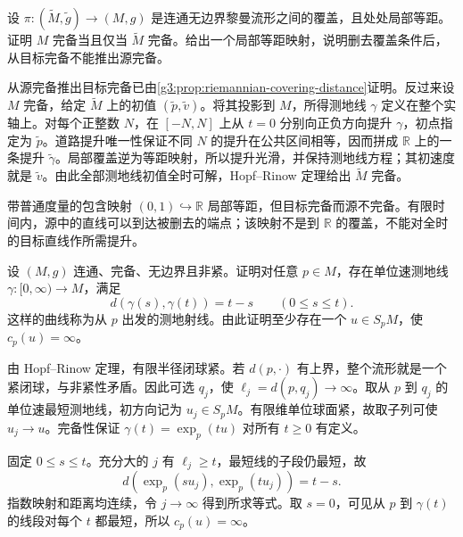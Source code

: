 \begin{exercise}\label{g3:ex:covering-completeness-converse}
	设 \(\pi:(\widetilde M,\widetilde g)\to(M,g)\) 是连通无边界黎曼流形之间的覆盖，且处处局部等距。证明 \(M\) 完备当且仅当 \(\widetilde M\) 完备。给出一个局部等距映射，说明删去覆盖条件后，从目标完备不能推出源完备。
\end{exercise}
\begin{solution}
	从源完备推出目标完备已由\cref{g3:prop:riemannian-covering-distance}证明。反过来设 \(M\) 完备，给定 \(\widetilde M\) 上的初值 \((\widetilde p,\widetilde v)\)。将其投影到 \(M\)，所得测地线 \(\gamma\) 定义在整个实轴上。对每个正整数 \(N\)，在 \([-N,N]\) 上从 \(t=0\) 分别向正负方向提升 \(\gamma\)，初点指定为 \(\widetilde p\)。道路提升唯一性保证不同 \(N\) 的提升在公共区间相等，因而拼成 \(\mathbb R\) 上的一条提升 \(\widetilde\gamma\)。局部覆盖逆为等距映射，所以提升光滑，并保持测地线方程；其初速度就是 \(\widetilde v\)。由此全部测地线初值全时可解，Hopf--Rinow 定理给出 \(\widetilde M\) 完备。

	带普通度量的包含映射 \((0,1)\hookrightarrow\mathbb R\) 局部等距，但目标完备而源不完备。有限时间内，源中的直线可以到达被删去的端点；该映射不是到 \(\mathbb R\) 的覆盖，不能对全时的目标直线作所需提升。
\end{solution}

\begin{exercise}\label{g3:ex:noncompact-complete-ray}
	设 \((M,g)\) 连通、完备、无边界且非紧。证明对任意 \(p\in M\)，存在单位速测地线 \(\gamma:[0,\infty)\to M\)，满足
	\[
		d(\gamma(s),\gamma(t))=t-s\qquad(0\le s\le t).
	\]
	这样的曲线称为从 \(p\) 出发的测地射线。由此证明至少存在一个 \(u\in S_pM\)，使 \(c_p(u)=\infty\)。
\end{exercise}
\begin{solution}
	由 Hopf--Rinow 定理，有限半径闭球紧。若 \(d(p,\cdot)\) 有上界，整个流形就是一个紧闭球，与非紧性矛盾。因此可选 \(q_j\)，使 \(\ell_j=d(p,q_j)\to\infty\)。取从 \(p\) 到 \(q_j\) 的单位速最短测地线，初方向记为 \(u_j\in S_pM\)。有限维单位球面紧，故取子列可使 \(u_j\to u\)。完备性保证 \(\gamma(t)=\exp_p(tu)\) 对所有 \(t\ge0\) 有定义。

	固定 \(0\le s\le t\)。充分大的 \(j\) 有 \(\ell_j\ge t\)，最短线的子段仍最短，故
	\[
		d(\exp_p(su_j),\exp_p(tu_j))=t-s.
	\]
	指数映射和距离均连续，令 \(j\to\infty\) 得到所求等式。取 \(s=0\)，可见从 \(p\) 到 \(\gamma(t)\) 的线段对每个 \(t\) 都最短，所以 \(c_p(u)=\infty\)。
\end{solution}

